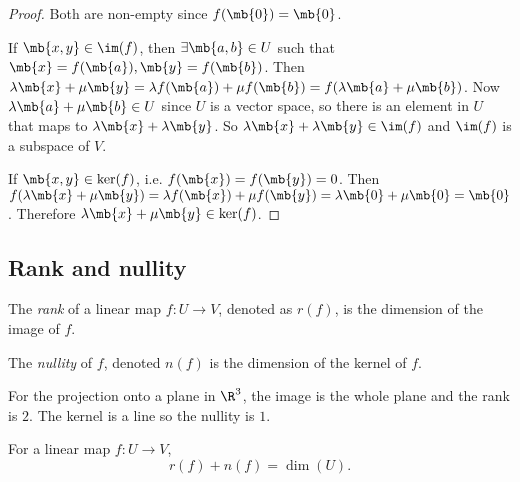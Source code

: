 \documentclass[a4paper]{article}
\begin{document}
\begin{proof}
  Both are non-empty since $f(\mb{0}) = \mb{0}$.

  If $\mb{x, y}\in \im (f)$, then $\exists \mb{a, b}\in U$ such that $\mb{x} = f(\mb{a}), \mb{y} = f(\mb{b})$.  Then $\lambda \mb{x} + \mu\mb {y} = \lambda f(\mb{a}) + \mu f(\mb{b}) = f(\lambda\mb{a} + \mu\mb{b})$. Now $\lambda\mb{a} + \mu\mb{b}\in U$ since $U$ is a vector space, so there is an element in $U$ that maps to $\lambda\mb{x}+ \lambda\mb{y}$. So $\lambda\mb{x}+ \lambda\mb{y}\in \im (f)$ and $\im (f)$ is a subspace of $V$.

  If $\mb{x, y}\in \ker(f)$, i.e. $f(\mb{x}) = f(\mb {y}) = 0$. Then $f(\lambda\mb{x} + \mu\mb{y}) = \lambda f(\mb{x}) + \mu f(\mb{y}) = \lambda \mb{0} + \mu\mb{0} = \mb{0}$. Therefore $\lambda\mb{x}+ \mu\mb{y} \in \ker (f)$.
\end{proof}

\subsection{Rank and nullity}
\begin{defi}
  The \emph{rank} of a linear map $f: U\to V$, denoted as $r(f)$, is the dimension of the image of $f$.
\end{defi}

\begin{defi}
  The \emph{nullity} of $f$, denoted $n(f)$ is the dimension of the kernel of $f$.
\end{defi}

\begin{eg}
  For the projection onto a plane in $\R^3$, the image is the whole plane and the rank is $2$. The kernel is a line so the nullity is $1$.
\end{eg}

\begin{thm}
  For a linear map $f: U \to V$,
  \[
  r(f) + n(f) = \dim (U).
  \]
\end{thm}
\end{document}
